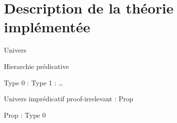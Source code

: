 \documentclass[12pt, aspectratio=169]{beamer}
\begin{document}
    \section{Description de la théorie implémentée}

        \begin{frame}[fragile]{Univers}
            
            \begin{block}{Hierarchie prédicative}
        
                Type 0 : Type 1 : \dots \pause

                \begin{center}
                    \begin{prooftree}
                    \end{prooftree}
                \end{center}
                
            \end{block}

            \begin{block}{Univers imprédicatif proof-irrelevant : Prop}
                
                Prop : Type 0 \pause

                \begin{center}
                    \begin{prooftree}
                    \end{prooftree}
                \end{center}

            \end{block}

        \end{frame}
\end{document}
